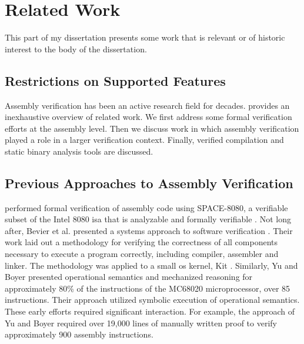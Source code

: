 \chapter{Related Work}
This part of my dissertation presents some work that is relevant
or of historic interest to the body of the dissertation.

\section{Restrictions on Supported Features}

Assembly verification has been an active research field for decades.
 provides an inexhaustive overview of related work.
We first address some formal verification efforts at the assembly level.
Then we discuss work in which assembly verification played a role in a larger verification context. 
Finally, verified compilation and static binary analysis tools are discussed.

\section{Previous Approaches to Assembly Verification}
\citet{clutterbuck1988verification} performed formal verification
of assembly code using SPACE-8080, a verifiable subset of the Intel 8080 \ac{isa} that is analyzable and formally verifiable \citep{carre1986spade}.
Not long after, Bevier et al. presented a systems approach to software verification \cite{bevier1989approach,boyer1979computational}.
Their work laid out a methodology for verifying the correctness
of all components necessary to execute a program correctly, including compiler, assembler and linker.
The methodology was applied to a small \ac{os} kernel, Kit \citep{bevier1989kit}.
Similarly, Yu and Boyer \citep{yu1992automated,boyer1996automated}
presented operational semantics and mechanized reasoning
for approximately 80\% of the instructions of the MC68020 microprocessor,
over 85 instructions.
Their approach utilized symbolic execution of operational semantics.
These early efforts required significant interaction.
For example, the approach of Yu and Boyer required over 19,000 lines of manually written proof to verify approximately 900 assembly instructions.

